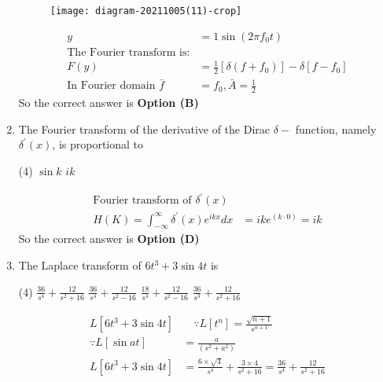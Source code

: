 \begin{enumerate}[label=\color{ocre}\textbf{\arabic*.}]
\begin{answer}
		\begin{figure}[H]
			\centering
			\texttt{[image: diagram-20211005(11)-crop]}
		\end{figure}
		\begin{align*}
		y&=1 \sin \left(2 \pi f_{0} t\right)\\
		\text{The Fourier transform is:}\\
		F(y)&=\frac{1}{2}\left[\delta\left(f+f_{0}\right)\right]-\delta\left[f-f_{0}\right]\\
		\text{In Fourier domain }\bar{f}&=f_{0}, \bar{A}=\frac{1}{2}
		\end{align*}
		So the correct answer is \textbf{Option (B)}
	\end{answer}
	\item The Fourier transform of the derivative of the Dirac $\delta-$ function, namely $\delta^{\prime}(x)$, is proportional to
	{}
	\begin{tasks}(4)
		\task[\textbf{C.}] $\sin k$
		\task[\textbf{D.}] $i k$
	\end{tasks}
	\begin{answer}
		\begin{align*}
		\text{Fourier transform of }\delta^{\prime}(x)\\
		H(K)=\int_{-\infty}^{\infty} \delta^{\prime}(x) e^{i k x} d x&=i k e^{(k \cdot 0)}=i k
		\end{align*}
		So the correct answer is \textbf{Option (D)}
	\end{answer}
	\item The Laplace transform of $6 t^{3}+3 \sin 4 t$ is
	{}
	\begin{tasks}(4)
		\task[\textbf{A.}] $\frac{36}{s^{4}}+\frac{12}{s^{2}+16}$
		\task[\textbf{B.}] $\frac{36}{s^{4}}+\frac{12}{s^{2}-16}$
		\task[\textbf{C.}] $\frac{18}{s^{4}}+\frac{12}{s^{2}-16}$
		\task[\textbf{D.}] $\frac{36}{s^{3}}+\frac{12}{s^{2}+16}$
	\end{tasks}
	\begin{answer}
		\begin{align*}
		L\left[6 t^{3}+3 \sin 4 t\right] &\quad \because L\left[t^{n}\right]=\frac{\sqrt{n+1}}{s^{n+1}}\\
		\because L[\sin a t]&=\frac{a}{\left(s^{2}+a^{2}\right)}\\
		L\left[6 t^{3}+3 \sin 4 t\right]&=\frac{6 \times \sqrt{4}}{s^{4}}+\frac{3 \times 4}{s^{2}+16}=\frac{36}{s^{4}}+\frac{12}{s^{2}+16}
		\end{align*}

\end{answer}
\end{enumerate}
